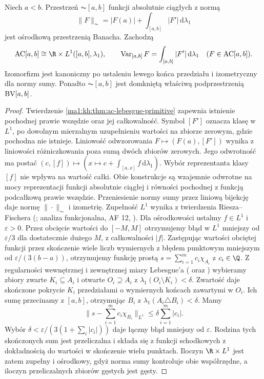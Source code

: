 \begin{twierdzenie}
\label{ma1:thm:ac-banach-separable}
Niech $a<b$. Przestrzeń $\AC[a,b]$ funkcji absolutnie ciągłych
z normą
\[
 \|F\|_{\AC}=|F(a)|+\int_{[a,b]}|F'|\,\mathrm d\lambda_1
\]
jest ośrodkową przestrzenią Banacha. Zachodzą
\[
 \AC[a,b]\cong\R\times L^1([a,b],\lambda_1),
 \qquad
 \Var_{[a,b]}F=\int_{[a,b]}|F'|\,\mathrm d\lambda_1
 \quad(F\in\AC[a,b]).
\]
Izomorfizm jest kanoniczny po ustaleniu lewego końca
przedziału i izometryczny dla normy sumy.
Ponadto $\AC[a,b]$ jest domkniętą właściwą
podprzestrzenią $\mathrm{BV}[a,b]$.
\end{twierdzenie}
\begin{proof}
Twierdzenie \ref{ma1:kh:thm:ac-lebesgue-primitive}
zapewnia istnienie pochodnej prawie wszędzie
oraz jej całkowalność. Symbol $[F']$ oznacza klasę
w $L^1$, po dowolnym mierzalnym uzupełnieniu
wartości na zbiorze zerowym, gdzie pochodna
nie istnieje. Liniowość odwzorowania
$F\mapsto(F(a),[F'])$ wynika z liniowości
różniczkowania poza sumą dwóch zbiorów zerowych.
Jego odwrotność ma postać
$(c,[f])\mapsto(x\mapsto c+\int_{[a,x]} f\,\mathrm d\lambda_1)$.
Wybór reprezentanta klasy $[f]$ nie wpływa na wartość
całki. Obie konstrukcje są wzajemnie odwrotne na mocy
reprezentacji funkcji absolutnie ciągłej i równości
pochodnej z funkcją podcałkową prawie wszędzie.
Przeniesienie normy sumy przez liniową bijekcję
daje normę $\|\cdot\|_{\AC}$ i izometrię.
Zupełność $L^1$ wynika z twierdzenia Riesza--Fischera
(;
analiza funkcjonalna, AF 12, ).
Dla ośrodkowości ustalmy $f\in L^1$ i $\varepsilon>0$.
Przez obcięcie wartości do $[-M,M]$ otrzymujemy błąd
w $L^1$ mniejszy od $\varepsilon/3$ dla dostatecznie
dużego $M$, z całkowalności $|f|$.
Zastępując wartości obciętej funkcji przez skończenie
wiele liczb wymiernych z błędem punktowym mniejszym
od $\varepsilon/(3(b-a))$, otrzymujemy funkcję prostą
$s=\sum_{i=1}^m c_i\chi_{A_i}$ z $c_i\in\Q$.
Z regularności wewnętrznej i zewnętrznej miary Lebesgue'a
(
oraz ) wybieramy zbiory
zwarte $K_i\subseteq A_i$ i otwarte $O_i\supseteq A_i$
z $\lambda_1(O_i\setminus K_i)<\delta$.
Zwartość daje skończone pokrycie $K_i$ przedziałami
o wymiernych końcach zawartymi w $O_i$.
Ich sumę przecinamy z $[a,b]$, otrzymując $B_i$
z $\lambda_1(A_i\triangle B_i)<\delta$.
Mamy
\[
 \Big\|s-\sum_{i=1}^m c_i\chi_{B_i}\Big\|_{L^1}
 \le\delta\sum_{i=1}^m |c_i|.
\]
Wybór $\delta<\varepsilon/(3(1+\sum_i|c_i|))$
daje łączny błąd mniejszy od $\varepsilon$.
Rodzina tych skończonych sum jest przeliczalna
i składa się z funkcji schodkowych z dokładnością
do wartości w skończenie wielu punktach.
Iloczyn $\R\times L^1$ jest zatem zupełny i ośrodkowy,
gdyż norma sumy kontroluje obie współrzędne,
a iloczyn przeliczalnych zbiorów gęstych jest gęsty.


\end{proof}
